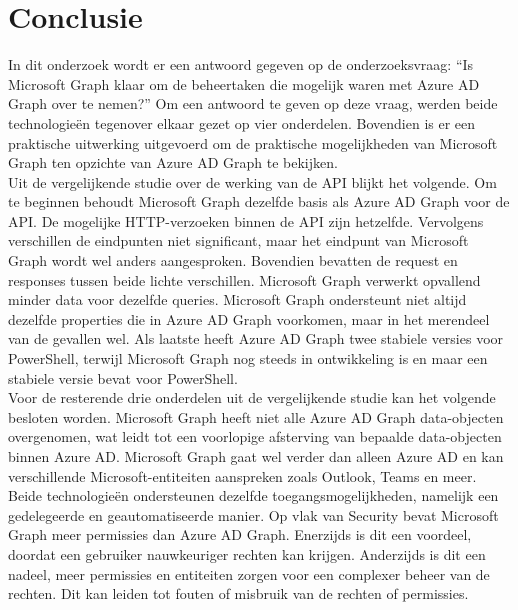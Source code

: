 
\chapter{Conclusie}%
\label{ch:conclusie}


In dit onderzoek wordt er een antwoord gegeven op de onderzoeksvraag: “Is Microsoft Graph klaar om de beheertaken die mogelijk waren met Azure AD Graph over te nemen?” Om een antwoord te geven op deze vraag, werden beide technologieën tegenover elkaar gezet op vier onderdelen. Bovendien is er een praktische uitwerking uitgevoerd om de praktische mogelijkheden van Microsoft Graph ten opzichte van Azure \Ac{AD} Graph te bekijken. \\

Uit de vergelijkende studie over de werking van de \Ac{API} blijkt het volgende. Om te beginnen behoudt Microsoft Graph dezelfde basis als Azure \Ac{AD} Graph voor de \Ac{API}. De mogelijke \Ac{HTTP}-verzoeken binnen de \Ac{API} zijn hetzelfde. Vervolgens verschillen de eindpunten niet significant, maar het eindpunt van Microsoft Graph wordt wel anders aangesproken. Bovendien bevatten de request en responses tussen beide lichte verschillen. Microsoft Graph verwerkt opvallend minder data voor dezelfde queries. Microsoft Graph ondersteunt niet altijd dezelfde properties die in Azure \Ac{AD} Graph voorkomen, maar in het merendeel van de gevallen wel. Als laatste heeft Azure \Ac{AD} Graph twee stabiele versies voor PowerShell, terwijl Microsoft Graph nog steeds in ontwikkeling is en maar een stabiele versie bevat voor PowerShell. \\

Voor de resterende drie onderdelen uit de vergelijkende studie kan het volgende besloten worden. Microsoft Graph heeft niet alle Azure \Ac{AD} Graph data-objecten overgenomen, wat leidt tot een voorlopige afsterving van bepaalde data-objecten binnen Azure \Ac{AD}. Microsoft Graph gaat wel verder dan alleen Azure \Ac{AD} en kan verschillende Microsoft-entiteiten aanspreken zoals Outlook, Teams en meer. Beide technologieën ondersteunen dezelfde toegangsmogelijkheden, namelijk een gedelegeerde en geautomatiseerde manier. Op vlak van Security bevat Microsoft Graph meer permissies dan Azure \Ac{AD} Graph. Enerzijds is dit een voordeel, doordat een gebruiker nauwkeuriger rechten kan krijgen. Anderzijds is dit een nadeel, meer permissies en entiteiten zorgen voor een complexer beheer van de rechten. Dit kan leiden tot fouten of misbruik van de rechten of permissies. \\ 

